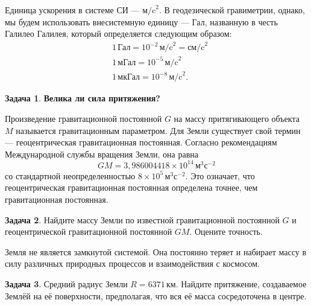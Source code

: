 \documentclass[11pt, a4paper]{article}
\theoremstyle{plain}
\theoremstyle{definition}
\newtheorem{problem}{Задача}[section]
\theoremstyle{remark}
\begin{document}
Единица ускорения в системе СИ --- $\text{м/c}^2$. В геодезической гравиметрии, однако, мы будем
использовать внесистемную единицу --- Гал, названную в честь Галилео Галилея, который определяется
следующим образом:
\begin{align*}
    &1\,\text{Гал} = 10^{-2}\,\text{м/c}^2 = \text{см/c}^2\\
    &1\,\text{мГал} = 10^{-5}\,\text{м/c}^2 \\
    &1\,\text{мкГал} = 10^{-8}\,\text{м/c}^2. 
\end{align*}

\begin{problem}
    \textbf{Велика ли сила притяжения?}
\end{problem}

Произведение гравитационной постоянной $G$ на массу притягивающего объекта $M$ называется
гравитационным параметром. Для Земли существует свой термин --- геоцентрическая гравитационная
постоянная. Согласно рекомендациям Международной службы вращения Земли\cite{iers2010}, она равна
\begin{equation*}
    GM = 3,986004418\times10^{14}\,\text{м}^3\text{с}^{-2}
\end{equation*}
со стандартной неопределенностью $8\times10^{5}\,\text{м}^3\text{с}^{-2}$. Это означает, что
геоцентрическая гравитационная постоянная определена точнее, чем гравитационная постоянная. 
\begin{problem}
    Найдите массу Земли по известной гравитационной постоянной $G$ и геоцентрической гравитационной
    постоянной $GM$. Оцените точность.
\end{problem}
Земля не является замкнутой системой. Она постоянно теряет и набирает массу в силу различных природных
процессов и взаимодействия с космосом.
\begin{problem}
    Средний радиус Земли $R = 6371\,\text{км}$. Найдите притяжение, создаваемое Землёй
    на её поверхности, предполагая, что вся её масса сосредоточена в центре.
\end{problem}

\printbibliography
\end{document}
